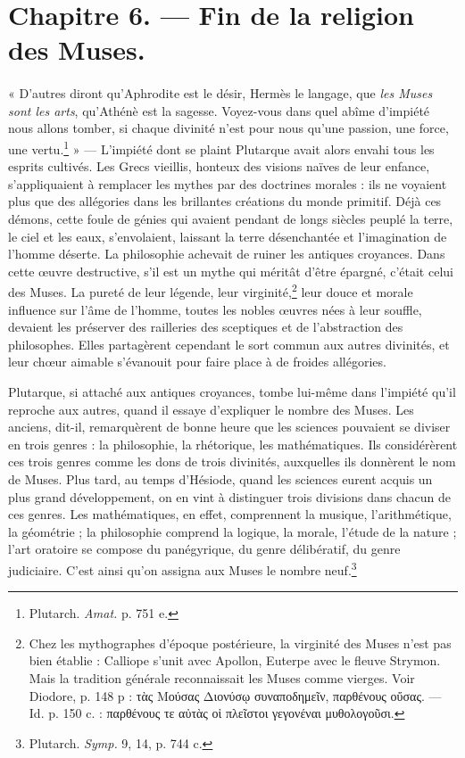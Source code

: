 \documentclass[landscape, a4paper, 11pt, oneside, polutonikogreek, french]{article}
\begin{document}
\section{Chapitre 6. --- Fin de la religion des Muses.}
\paragraph{}
« D'autres diront qu'Aphrodite est le désir, Hermès le langage, que \emph{les Muses sont les arts}, qu'Athénè est la sagesse. Voyez-vous dans quel abîme d'impiété nous allons tomber, si chaque divinité n'est pour nous qu'une passion, une force, une vertu.\footnote{Plutarch. \emph{Amat.} p. 751 e.} » --- L'impiété dont se plaint Plutarque avait alors envahi tous les esprits cultivés. Les Grecs vieillis, honteux des visions naïves de leur enfance, s'appliquaient à remplacer les mythes par des doctrines morales : ils ne voyaient plus que des allégories dans les brillantes créations du monde primitif. Déjà ces démons, cette foule de génies qui avaient pendant de longs siècles peuplé la terre, le ciel et les eaux, s'envolaient, laissant la terre désenchantée et l'imagination de l'homme déserte. La philosophie achevait de ruiner les antiques croyances. Dans cette œuvre destructive, s'il est un mythe qui méritât d'être épargné, c'était celui des Muses. La pureté de leur légende, leur virginité,\footnote{Chez les mythographes d'époque postérieure, la virginité des Muses n'est pas bien établie : Calliope s'unit avec Apollon, Euterpe avec le fleuve Strymon. Mais la tradition générale reconnaissait les Muses comme vierges. Voir Diodore, p. 148 p : τὰς Μούσας Διονύσῳ συναποδημεῖν, παρθένους οὔσας. --- Id. p. 150 c. : παρθένους τε αὐτὰς οἱ πλεῖστοι γεγονέναι μυθολογοῦσι.} leur douce et morale influence sur l'âme de l'homme, toutes les nobles œuvres nées à leur souffle, devaient les préserver des railleries des sceptiques et de l'abstraction des philosophes. Elles partagèrent cependant le sort commun aux autres divinités, et leur chœur aimable s'évanouit pour faire place à de froides allégories.

Plutarque, si attaché aux antiques croyances, tombe lui-même dans l'impiété qu'il reproche aux autres, quand il essaye d'expliquer le nombre des Muses. Les anciens, dit-il, remarquèrent de bonne heure que les sciences pouvaient se diviser en trois genres : la philosophie, la rhétorique, les mathématiques. Ils considérèrent ces trois genres comme les dons de trois divinités, auxquelles ils donnèrent le nom de Muses. Plus tard, au temps d'Hésiode, quand les sciences eurent acquis un plus grand développement, on en vint à distinguer trois divisions dans chacun de ces genres. Les mathématiques, en effet, comprennent la musique, l'arithmétique, la géométrie ; la philosophie comprend la logique, la morale, l'étude de la nature ; l'art oratoire se compose du panégyrique, du genre délibératif, du genre judiciaire. C'est ainsi qu'on assigna aux Muses le nombre neuf.\footnote{Plutarch. \emph{Symp.} 9, 14, p. 744 c.}
\end{document}
